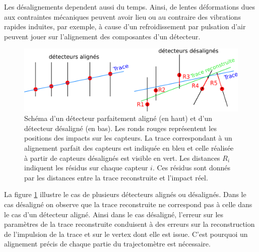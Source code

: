   \medskip
  
   Les d\'esalignements dependent aussi du temps. Ainsi, de lentes déformations dues aux contraintes m\'ecaniques peuvent avoir lieu ou au contraire des vibrations rapides induites, par exemple, \`a cause d'un refroidissement par pulsation d'air peuvent jouer sur l'alignement des composantes d'un d\'etecteur.
   
   \begin{figure}[!htb]
    \begin{center}
      \includegraphics[scale=1.00]{./figures/schema_desalignement2.png}
       \caption{Sch\'ema d'un d\'etecteur parfaitement align\'e (en haut) et d'un d\'etecteur d\'esalign\'e (en bas). Les ronds rouges repr\'esentent les positions des impacts sur les capteurs. La trace correspondant \`a un alignement parfait des capteurs est indiqu\'ee en bleu et celle r\'ealis\'ee \`a partir de capteurs d\'esalign\'es est visible en vert. Les distances $R_i$ indiquent les r\'esidus sur chaque capteur $i$. Ces r\'esidus sont donn\'es par les distances entre la trace reconstruite et l'impact r\'eel.}
      \label{fig:desalignement}
    \end{center}
  \end{figure}
   
   \medskip
   
   La figure \ref{fig:desalignement} illustre le cas de plusieurs détecteurs align\'es ou d\'esalign\'es. Dans le cas d\'esalign\'e on observe que la trace reconstruite ne correspond pas \`a celle dans le cas d'un d\'etecteur align\'e. Ainsi dans le cas d\'esalign\'e, l'erreur sur les param\`etres de la trace reconstruite conduisent \`a des erreurs sur la reconstruction de l'impulsion de la trace et sur le vertex dont elle est issue. C'est pourquoi un alignement pr\'ecis de chaque partie du trajectom\`etre est n\'ecessaire.
   
   \medskip
   
   
